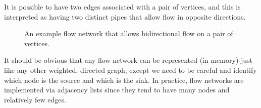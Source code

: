 \documentclass[11pt]{article}
\theoremstyle{plain}
\theoremstyle{definition}
\begin{document}
\noindent It is possible to have two edges associated with a pair of vertices, and this is interpreted as having two distinct pipes that allow flow in opposite directions.
\begin{figure}[h]
\caption{An example flow network that allows bidirectional flow on a pair of vertices.}
\centering
{}
\end{figure}
It should be obvious that any flow network can be represented (in memory) just like any other weighted, directed graph, except we need to be careful and identify which node is the source and which is the sink. In practice, flow networks are implemented via adjacency lists since they tend to have many nodes and relatively few edges.
\end{document}
